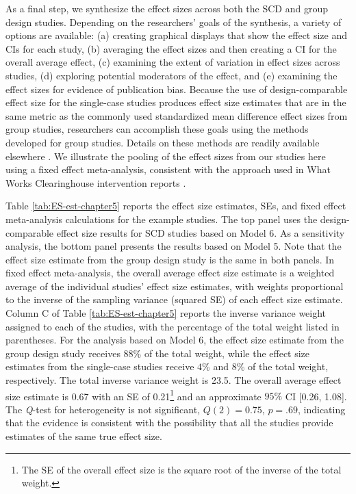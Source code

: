 \documentclass[
]{book}
\begin{document}
As a final step, we synthesize the effect sizes across both the SCD and group design studies. Depending on the researchers' goals of the synthesis, a variety of options are available: (a) creating graphical displays that show the effect size and CIs for each study, (b) averaging the effect sizes and then creating a CI for the overall average effect, (c) examining the extent of variation in effect sizes across studies, (d) exploring potential moderators of the effect, and (e) examining the effect sizes for evidence of publication bias. Because the use of design-comparable effect size for the single-case studies produces effect size estimates that are in the same metric as the commonly used standardized mean difference effect sizes from group studies, researchers can accomplish these goals using the methods developed for group studies. Details on these methods are readily available elsewhere \citep[e.g.,][]{borenstein2021introduction, cooper2019handbook}. We illustrate the pooling of the effect sizes from our studies here using a fixed effect meta-analysis, consistent with the approach used in What Works Clearinghouse intervention reports \citep{whatworksclearinghouse2020What}.

Table \ref{tab:ES-est-chapter5} reports the effect size estimates, SEs, and fixed effect meta-analysis calculations for the example studies. The top panel uses the design-comparable effect size results for SCD studies based on Model 6. As a sensitivity analysis, the bottom panel presents the results based on Model 5. Note that the effect size estimate from the group design study is the same in both panels. In fixed effect meta-analysis, the overall average effect size estimate is a weighted average of the individual studies' effect size estimates, with weights proportional to the inverse of the sampling variance (squared SE) of each effect size estimate.
Column C of Table \ref{tab:ES-est-chapter5} reports the inverse variance weight assigned to each of the studies, with the percentage of the total weight listed in parentheses. For the analysis based on Model 6, the effect size estimate from the group design study receives \(88\%\) of the total weight, while the effect size estimates from the single-case studies receive \(4\%\) and \(8\%\) of the total weight, respectively. The total inverse variance weight is 23.5. The overall average effect size estimate is 0.67 with an SE of 0.21\footnote{The SE of the overall effect size is the square root of the inverse of the total weight.} and an approximate \(95\%\) CI {[}0.26, 1.08{]}. The \emph{Q}-test for heterogeneity is not significant, \(Q(2) = 0.75\), \(p = .69\), indicating that the evidence is consistent with the possibility that all the studies provide estimates of the same true effect size.
\end{document}
